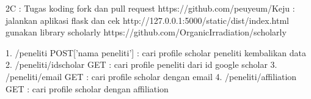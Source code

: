 2C :
Tugas koding fork dan pull request https://github.com/peuyeum/Keju :
jalankan aplikasi flask dan cek http://127.0.0.1:5000/static/dist/index.html
gunakan library scholarly https://github.com/OrganicIrradiation/scholarly

1. /peneliti POST['nama peneliti'] : cari profile scholar peneliti kembalikan data
2. /peneliti/{idscholar} GET : cari profile peneliti dari id google scholar
3. /peneliti/{email} GET : cari profile scholar dengan email
4. /peneliti/{affiliation} GET : cari profile scholar dengan affiliation